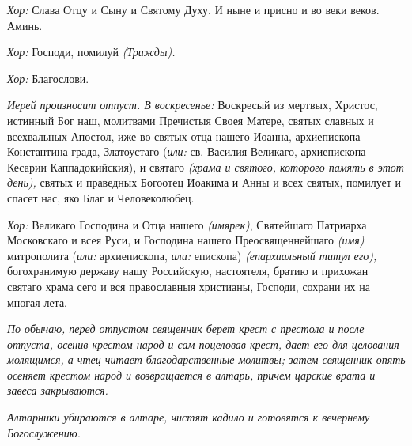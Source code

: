 \begin{mymulticols}
{\itshape Хор:} Слава Отцу и Сыну и Святому Духу. И ныне и присно и во веки веков. Аминь. 

{\itshape Хор:} Господи, помилуй {\itshape (Трижды).}

{\itshape Хор:} Благослови. 


{\itshape Иерей произносит отпуст. В воскресенье:} Воскресый из мертвых, Христос, истинный Бог наш, молитвами Пречистыя Своея Матере, святых славных и всехвальных Апостол, иже во святых отца нашего Иоанна, архиепископа Константина града, Златоустаго ({\itshape или:} св. Василия Великаго, архиепископа Кесарии Каппадокийския), и святаго {\itshape (храма и святого, которого память в этот день),} святых и праведных Богоотец Иоакима и Анны и всех святых, помилует и спасет нас, яко Благ и Человеколюбец.


{\itshape Хор:} Великаго Господина и Отца нашего {\itshape (имярек)}, Святейшаго Патриарха Московскаго и всея Руси, и Господина нашего Преосвященнейшаго {\itshape (имя)} митрополита ({\itshape или:} архиепископа, {\itshape или:} епископа) {\itshape (епархиальный титул его),} богохранимую державу нашу Российскую, настоятеля, братию и прихожан святаго храма сего и вся православныя христианы, Господи, сохрани их на многая лета.

{\itshape По обычаю, перед отпустом священник берет крест с престола и после отпуста, осенив крестом народ и сам поцеловав крест, дает его для целования молящимся, а чтец читает благодарственные молитвы; затем священник опять осеняет крестом народ и возвращается в алтарь, причем царские врата и завеса закрываются.}

{\itshape Алтарники убираются в алтаре, чистят кадило и готовятся к вечернему Богослужению.}

\end{mymulticols}

\mychapterending
